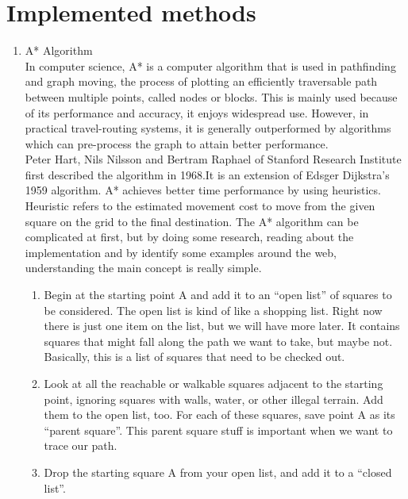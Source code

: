 \documentclass[twocolumn]{IEEEtran}
\begin{document}
\section{Implemented methods} 
	\begin{enumerate}
    
    \item A* Algorithm\\
    
    In computer science, A* is a computer algorithm that is used in pathfinding and graph moving, the process of plotting an efficiently traversable path between multiple points, called nodes or blocks. This is mainly used because of its performance and accuracy, it enjoys widespread use. However, in practical travel-routing systems, it is generally outperformed by algorithms which can pre-process the graph to attain better performance.\\

Peter Hart, Nils Nilsson and Bertram Raphael of Stanford Research Institute first described the algorithm in 1968.It is an extension of Edsger Dijkstra's 1959 algorithm. A* achieves better time performance by using heuristics. Heuristic refers to the estimated movement cost to move from the given square on the grid to the final destination. The A* algorithm can be complicated at first, but by doing some research, reading about the implementation and by identify some examples around the web, understanding the main concept is really simple.\\

	\begin{enumerate}
    
	\item Begin at the starting point A and add it to an “open list” of squares to be considered. The open list is kind of like a shopping list. Right now there is just one item on the list, but we will have more later. It contains squares that might fall along the path we want to take, but maybe not. Basically, this is a list of squares that need to be checked out.
    
    \item Look at all the reachable or walkable squares adjacent to the starting point, ignoring squares with walls, water, or other illegal terrain. Add them to the open list, too. For each of these squares, save point A as its “parent square”. This parent square stuff is important when we want to trace our path.
    
    \item Drop the starting square A from your open list, and add it to a “closed list”.
    

\end{enumerate}
\end{enumerate}
\end{document}
